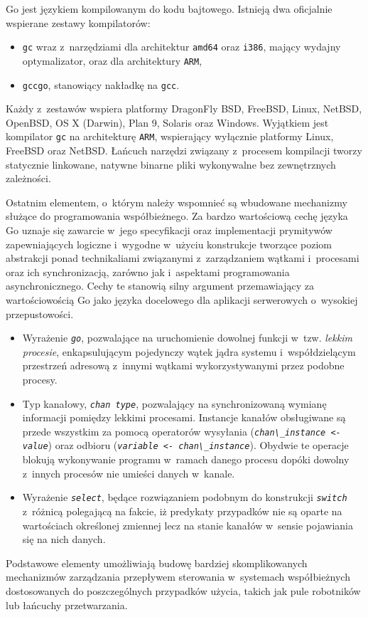 \par{
  Go jest językiem kompilowanym do kodu bajtowego. Istnieją dwa oficjalnie wspierane zestawy kompilatorów:
  \begin{itemize}
    \item \texttt{gc} wraz z~narzędziami dla architektur \texttt{amd64} oraz \texttt{i386}, mający wydajny optymalizator, oraz dla architektury \texttt{ARM},
    \item \texttt{gccgo}, stanowiący nakładkę na \texttt{gcc}.
  \end{itemize}
  Każdy z~zestawów wspiera platformy DragonFly BSD, FreeBSD, Linux, NetBSD, OpenBSD, OS X (Darwin), Plan 9, Solaris oraz Windows. Wyjątkiem jest kompilator \texttt{gc} na architekturę \texttt{ARM}, wspierający wyłącznie platformy Linux, FreeBSD oraz NetBSD. \cite{godoc:compilers}
  Łańcuch narzędzi związany z~procesem kompilacji tworzy statycznie linkowane, natywne binarne pliki wykonywalne bez zewnętrznych zależności.
}

\par{
  Ostatnim elementem, o~którym należy wspomnieć są wbudowane mechanizmy służące do programowania współbieżnego.
  Za bardzo wartościową cechę języka Go uznaje się zawarcie w~jego specyfikacji oraz implementacji prymitywów zapewniających logiczne i~wygodne w~użyciu konstrukcje tworzące poziom abstrakcji ponad technikaliami związanymi z~zarządzaniem wątkami i~procesami oraz ich synchronizacją, zarówno jak i~aspektami programowania asynchronicznego.
  Cechy te stanowią silny argument przemawiający za wartościowością Go jako języka docelowego dla aplikacji serwerowych o~wysokiej przepustowości.
  \begin{itemize}
    \item Wyrażenie \textit{\lstinline{go}}, pozwalające na uruchomienie dowolnej funkcji w~tzw. \emph{lekkim procesie}, enkapsulującym pojedynczy wątek jądra systemu i~współdzielącym przestrzeń adresową z~innymi wątkami wykorzystywanymi przez podobne procesy.
    \item Typ kanałowy, \textit{\lstinline{chan type}}, pozwalający na synchronizowaną wymianę informacji pomiędzy lekkimi procesami. Instancje kanałów obsługiwane są przede wszystkim za pomocą operatorów wysyłania (\textit{\lstinline{chan\_instance <- value}}) oraz odbioru (\textit{\lstinline{variable <- chan\_instance}}). Obydwie te operacje blokują wykonywanie programu w~ramach danego procesu dopóki dowolny z~innych procesów nie umieści danych w~kanale.
    \item Wyrażenie \textit{\lstinline{select}}, będące rozwiązaniem podobnym do konstrukcji \textit{\lstinline{switch}} z~różnicą polegającą na fakcie, iż predykaty przypadków nie są oparte na wartościach określonej zmiennej lecz na stanie kanałów w~sensie pojawiania się na nich danych.
  \end{itemize}
  Podstawowe elementy umożliwiają budowę bardziej skomplikowanych mechanizmów zarządzania przepływem sterowania w~systemach współbieżnych dostosowanych do poszczególnych przypadków użycia, takich jak pule robotników lub łańcuchy przetwarzania.
}